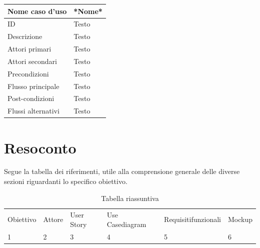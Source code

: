 \documentclass{article}
\begin{document}
\begin{table}[htbp]
\begin{tabular*}{\textwidth}{ @{\extracolsep{\fill}} || l | p{} || }
    \hline
    Nome caso d'uso & *Nome* \\
    \hline\hline
    ID & Testo \\
    \hline
    Descrizione & Testo \\
    \hline
    Attori primari & Testo \\
    \hline
    Attori secondari & Testo \\
    \hline
    Precondizioni & Testo \\
    \hline
    Flusso principale & Testo \\
    \hline
    Post-condizioni & Testo \\
    \hline
    Flussi alternativi & Testo \\
    \hline
\end{tabular*}
\end{table}

\clearpage

\section{Resoconto}

Segue la tabella dei riferimenti, utile alla comprensione generale delle diverse sezioni riguardanti lo specifico obiettivo.\\

\begin{table}[htbp]
    \centering
    \begin{tabularx}{\textwidth}{|X|X|X|X|X|X|}
        \Xhline{2pt} %
        Obiettivo & Attore & User Story & Use Case\newline diagram & Requisiti\newline funzionali & Mockup \\
        \Xhline{2pt} %
        1 & 2 & 3 & 4 & 5 & 6 \\
        \hline
    \end{tabularx}
    \caption{Tabella riassuntiva}
    \label{tab:tabella_tutta_pagina}
\end{table}
\end{document}

